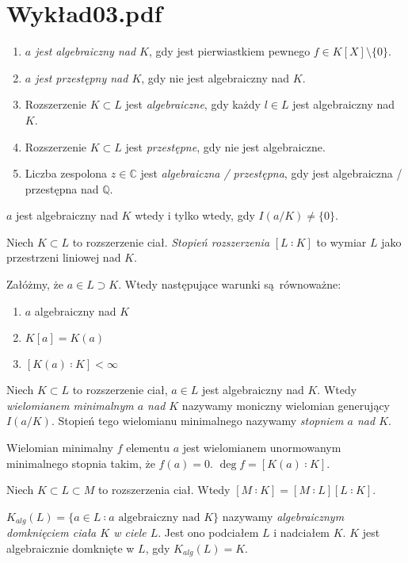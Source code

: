 \documentclass[a4paper, 12pt]{article}
\newcommand{\+}{\enspace}
\begin{document}
\section*{Wykład03.pdf}
\begin{enumerate}
	\item \textit{$a$ jest algebraiczny nad $K$},
		gdy jest pierwiastkiem pewnego $f∈K[X]\setminus\{0\}$.
	\item \textit{$a$ jest przestępny nad $K$}, gdy nie jest algebraiczny nad $K$.
	\item Rozszerzenie $K⊂L$ jest \textit{algebraiczne},
		gdy każdy $l∈L$ jest algebraiczny nad $K$.
	\item Rozszerzenie $K⊂L$ jest \textit{przestępne}, gdy nie jest algebraiczne.
	\item Liczba zespolona $z∈ℂ$ jest \textit{algebraiczna / przestępna},
		gdy jest algebraiczna / przestępna nad $ℚ$.
\end{enumerate}

$a$ jest algebraiczny nad $K$ wtedy i tylko wtedy, gdy
$I(a/K) ≠ \{0\}$.

Niech $K⊂L$ to rozszerzenie ciał.
\textit{Stopień rozszerzenia} $[L∶K]$ to wymiar $L$ jako przestrzeni liniowej nad $K$.

Załóżmy, że $a ∈ L ⊃ K$.
Wtedy następujące warunki są równoważne:
\begin{enumerate}
	\item $a$ algebraiczny nad $K$
	\item $K[a] = K(a)$
	\item $[K(a)∶K] < ∞$
\end{enumerate}

Niech $K⊂L$ to rozszerzenie ciał, $a∈L$ jest algebraiczny nad $K$.
Wtedy \textit{wielomianem minimalnym $a$ nad $K$} nazywamy moniczny wielomian
generujący $I(a/K)$.
Stopień tego wielomianu minimalnego nazywamy \textit{stopniem $a$ nad $K$}.

Wielomian minimalny $f$ elementu $a$ jest wielomianem unormowanym
minimalnego stopnia takim, że $f(a) = 0$.
$\deg f = [K(a) ∶ K]$.

Niech $K⊂L⊂M$ to rozszerzenia ciał.
Wtedy $[M∶K] = [M∶L][L∶K]$.

$K_{alg}(L) = \{ a ∈ L ∶ a \text{ algebraiczny nad }K \}$
nazywamy \textit{algebraicznym domknięciem ciała $K$ w ciele $L$}.
Jest ono podciałem $L$ i nadciałem $K$.
$K$ jest algebraicznie domknięte w $L$, gdy $K_{alg}(L) = K$.
\end{document}

